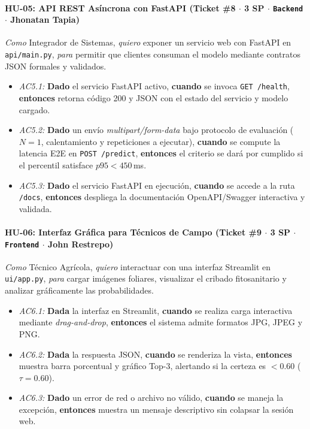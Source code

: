 \documentclass[12pt,letterpaper]{article}
\begin{document}
\paragraph{HU-05: API REST Asíncrona con FastAPI (Ticket \#8 $\cdot$ 3 SP $\cdot$ \texttt{Backend} $\cdot$ Jhonatan Tapia)}
\textit{Como} Integrador de Sistemas, \textit{quiero} exponer un servicio web con FastAPI en \texttt{api/main.py}, \textit{para} permitir que clientes consuman el modelo mediante contratos JSON formales y validados.
\begin{itemize}[leftmargin=*,noitemsep]
    \item \textit{AC5.1:} \textbf{Dado} el servicio FastAPI activo, \textbf{cuando} se invoca \texttt{GET /health}, \textbf{entonces} retorna código 200 y JSON con el estado del servicio y modelo cargado.
    \item \textit{AC5.2:} \textbf{Dado} un envío \textit{multipart/form-data} bajo protocolo de evaluación ($N=1$, calentamiento y repeticiones a ejecutar), \textbf{cuando} se compute la latencia E2E en \texttt{POST /predict}, \textbf{entonces} el criterio se dará por cumplido si el percentil satisface $p95 < 450$\,ms.
    \item \textit{AC5.3:} \textbf{Dado} el servicio FastAPI en ejecución, \textbf{cuando} se accede a la ruta \texttt{/docs}, \textbf{entonces} despliega la documentación OpenAPI/Swagger interactiva y validada.
\end{itemize}

\paragraph{HU-06: Interfaz Gráfica para Técnicos de Campo (Ticket \#9 $\cdot$ 3 SP $\cdot$ \texttt{Frontend} $\cdot$ John Restrepo)}
\textit{Como} Técnico Agrícola, \textit{quiero} interactuar con una interfaz Streamlit en \texttt{ui/\allowbreak app.py}, \textit{para} cargar imágenes foliares, visualizar el cribado fitosanitario y analizar gráficamente las probabilidades.
\begin{itemize}[leftmargin=*,noitemsep]
    \item \textit{AC6.1:} \textbf{Dada} la interfaz en Streamlit, \textbf{cuando} se realiza carga interactiva mediante \textit{drag-and-drop}, \textbf{entonces} el sistema admite formatos JPG, JPEG y PNG.
    \item \textit{AC6.2:} \textbf{Dada} la respuesta JSON, \textbf{cuando} se renderiza la vista, \textbf{entonces} muestra barra porcentual y gráfico Top-$3$, alertando si la certeza es $< 0.60$ ($\tau = 0.60$).
    \item \textit{AC6.3:} \textbf{Dado} un error de red o archivo no válido, \textbf{cuando} se maneja la excepción, \textbf{entonces} muestra un mensaje descriptivo sin colapsar la sesión web.
\end{itemize}
\end{document}
